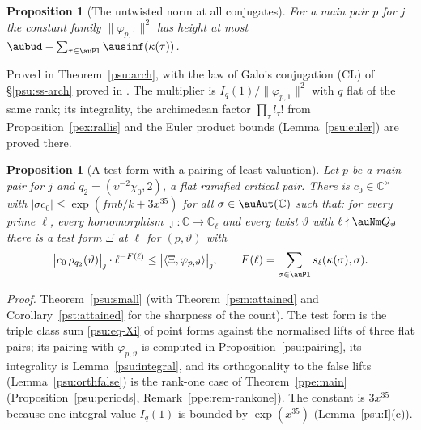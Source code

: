 \documentclass[10pt]{amsart}
\newtheorem{proposition}[theorem]{Proposition}
\theoremstyle{definition}
\theoremstyle{remark}
\newcommand{\C}{\mathbb C}
\begin{document}
\begin{proposition}[The untwisted norm at all conjugates]\label{po:arch}
For a main pair $p$ for $j$ the constant family $\|\varphi_{p,1}\|^2$ has height at most
$\aubud-\sum_{\tau\in\auPl}\ausinf(\kappa(\tau))$.
\end{proposition}
\noindent Proved in Theorem~\ref{psu:arch}, with the law of Galois conjugation (CL) of
\S\ref{psu:ss-arch} proved in {\cite[Theorem~9.1]{P53}}. The multiplier is $I_q(1)/\|\varphi_{p,1}\|^2$ with
$q$ flat of the same rank; its integrality, the archimedean factor $\prod_\tau l_\tau!$ from
Proposition~\ref{pex:rallis} and the Euler product bounds (Lemma~\ref{psu:euler}) are proved there.


\begin{proposition}[A test form with a pairing of least valuation]\label{po:small}
Let $p$ be a main pair for $j$ and $q_2=(\upsilon^{-2}\chi_0,2)$, a flat ramified critical pair.
There is $c_0\in\C^\times$ with $|\sigma c_0|\le\exp(fmb/k+3x^{35})$ for all $\sigma\in\auAut(\C)$
such that: for every prime $\ell$, every homomorphism $\jmath\colon\C\to\C_\ell$ and every twist
$\vartheta$ with $\ell\nmid\auNm Q_\vartheta$ there is a test form $\Xi$ at $\ell$ for
$(p,\vartheta)$ with
\[
\bigl|c_0\,\rho_{q_2}(\vartheta)\bigr|_\jmath\cdot\ell^{-F(\ell)}\le\bigl|\langle\Xi,\varphi_{p,
\vartheta}\rangle\bigr|_\jmath,\qquad F(\ell)=\sum_{\sigma\in\auPl}s_\ell(\kappa(\sigma),\sigma).
\]
\end{proposition}
\noindent\emph{Proof.} Theorem~\ref{psu:small} (with Theorem~\ref{psm:attained} and
Corollary~\ref{pst:attained} for the sharpness of the count). The test form is the triple class sum
\eqref{psu:eq-Xi} of point forms against the normalised lifts of three flat pairs; its pairing with
$\varphi_{p,\vartheta}$ is computed in Proposition~\ref{psu:pairing}, its integrality is
Lemma~\ref{psu:integral}, and its orthogonality to the false lifts (Lemma~\ref{psu:orthfalse}) is the
rank-one case of Theorem~\ref{ppe:main} (Proposition~\ref{psu:periods}, Remark~\ref{ppe:rem-rankone}).
The constant is $3x^{35}$ because one integral value $I_q(1)$ is bounded by $\exp(x^{35})$
(Lemma~\ref{psu:I}(c)).
\end{document}
